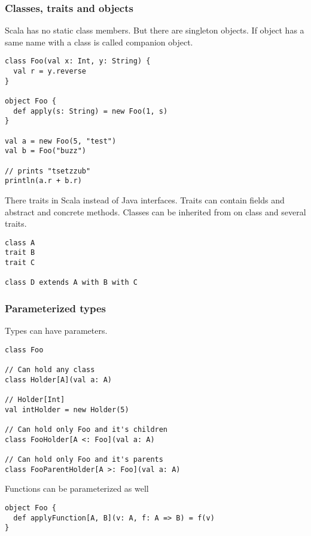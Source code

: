 \begin{frame}[fragile]
\frametitle{Classes, traits and objects}

Scala has no static class members. But there are singleton objects. If object has a same name with a class is called companion object.

\begin{lstlisting}
class Foo(val x: Int, y: String) {
  val r = y.reverse
}

object Foo {
  def apply(s: String) = new Foo(1, s)
}

val a = new Foo(5, "test")
val b = Foo("buzz")

// prints "tsetzzub"
println(a.r + b.r)
\end{lstlisting}

There traits in Scala instead of Java interfaces. Traits can contain fields and abstract and concrete methods. Classes can be inherited from on class and several traits.

\begin{lstlisting}
class A
trait B
trait C

class D extends A with B with C
\end{lstlisting}

\end{frame}

\begin{frame}[fragile]
\frametitle{Parameterized types}

Types can have parameters.

\begin{lstlisting}
class Foo

// Can hold any class
class Holder[A](val a: A)

// Holder[Int]
val intHolder = new Holder(5)

// Can hold only Foo and it's children
class FooHolder[A <: Foo](val a: A)

// Can hold only Foo and it's parents
class FooParentHolder[A >: Foo](val a: A)
\end{lstlisting}

Functions can be parameterized as well

\begin{lstlisting}
object Foo {
  def applyFunction[A, B](v: A, f: A => B) = f(v)
}
\end{lstlisting}

\end{frame}

